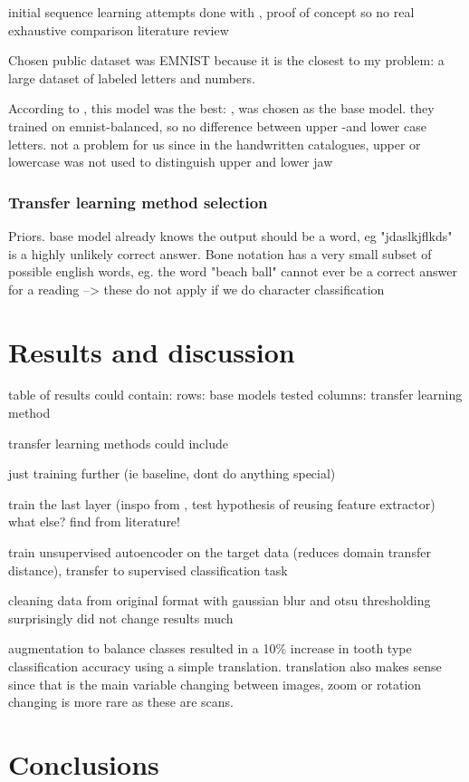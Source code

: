 \documentclass{article}
\begin{document}
initial sequence learning attempts done with \cite{li2021trocr}, proof of concept so no real exhaustive comparison literature review

Chosen public dataset was EMNIST \cite{emnist} because it is the closest to my problem: a large dataset of labeled letters and numbers.

According to \cite{emnistclassifiersurvey}, this model was the best: \cite{jamilemnist}, was chosen as the base model.
they trained on emnist-balanced, so no difference between upper -and lower case letters. not a problem for us since 
in the handwritten catalogues, upper or lowercase was not used to distinguish upper and lower jaw

\subsubsection{Transfer learning method selection}
Priors. base model already knows the output should be a word, eg "jdaslkjflkds" is a highly unlikely
correct answer.
Bone notation has a very small subset of possible english words, eg. the word "beach ball" cannot ever be a correct 
answer for a reading
--> these do not apply if we do character classification


\section{Results and discussion}



table of results could contain:
rows: base models tested 
columns: transfer learning method 

transfer learning methods could include 

just training further (ie baseline, dont do anything special)

train the last layer (inspo from \cite{tibetan_ocr}, test hypothesis of reusing feature extractor)
what else? find from literature!

train unsupervised autoencoder on the target data (reduces domain transfer distance),
transfer to supervised classification task

cleaning data from original format with gaussian blur and otsu thresholding surprisingly did not 
change results much 

augmentation to balance classes resulted in a 10\% increase in tooth type classification accuracy 
using a simple translation. translation also makes sense since that is the main variable changing 
between images, zoom or rotation changing is more rare as these are scans.


\section{Conclusions}

\printbibliography
\end{document}
